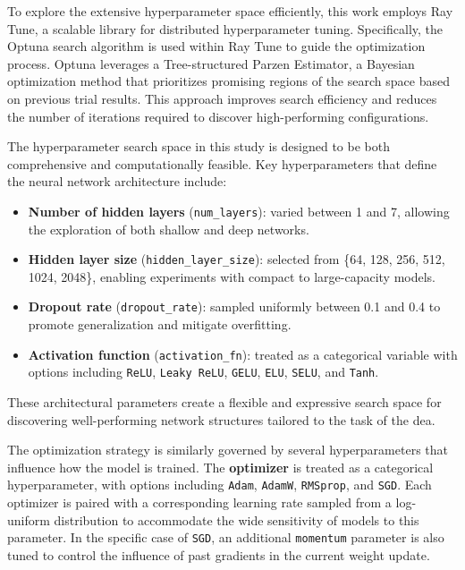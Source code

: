 To explore the extensive hyperparameter space efficiently, this work employs Ray Tune, a scalable library for distributed hyperparameter tuning.
Specifically, the Optuna search algorithm is used within Ray Tune to guide the optimization process.
Optuna leverages a Tree-structured Parzen Estimator, a Bayesian optimization method that prioritizes promising regions of the search space based on previous trial results.
This approach improves search efficiency and reduces the number of iterations required to discover high-performing configurations.

The hyperparameter search space in this study is designed to be both comprehensive and computationally feasible.
Key hyperparameters that define the neural network architecture include:

\begin{itemize}
    \item \textbf{Number of hidden layers} (\texttt{num\_layers}): varied between 1 and 7, allowing the exploration of both shallow and deep networks.
    \item \textbf{Hidden layer size} (\texttt{hidden\_layer\_size}): selected from \{64, 128, 256, 512, 1024, 2048\}, enabling experiments with compact to large-capacity models.
    \item \textbf{Dropout rate} (\texttt{dropout\_rate}): sampled uniformly between 0.1 and 0.4 to promote generalization and mitigate overfitting.
    \item \textbf{Activation function} (\texttt{activation\_fn}): treated as a categorical variable with options including \texttt{ReLU}, \texttt{Leaky ReLU}, \texttt{GELU}, \texttt{ELU}, \texttt{SELU}, and \texttt{Tanh}.
\end{itemize}

These architectural parameters create a flexible and expressive search space for discovering well-performing network structures tailored to the task of the \ac{dea}.

The optimization strategy is similarly governed by several hyperparameters that influence how the model is trained.
The \textbf{optimizer} is treated as a categorical hyperparameter, with options including \texttt{Adam}, \texttt{AdamW}, \texttt{RMSprop}, and \texttt{SGD}.
Each optimizer is paired with a corresponding learning rate sampled from a log-uniform distribution to accommodate the wide sensitivity of models to this parameter.
In the specific case of \texttt{SGD}, an additional \texttt{momentum} parameter is also tuned to control the influence of past gradients in the current weight update.


